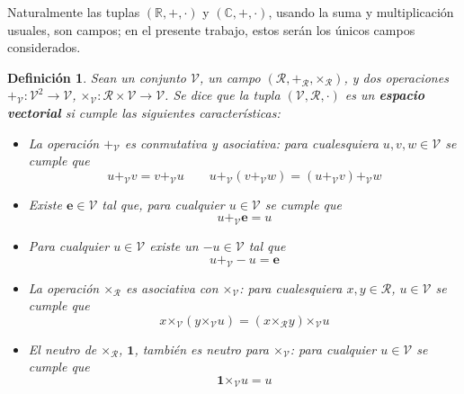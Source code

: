 \documentclass[12pt,letterpaper]{book}
\newtheorem{definicion}{Definición}[chapter]
\newcommand{\R}{\mathbb{R}}
\newcommand{\C}{\mathbb{C}}
\begin{document}
Naturalmente las tuplas $(\R,+,\cdot)$ y $(\C,+,\cdot)$, usando la suma y multiplicación usuales, son campos; en el presente trabajo, estos serán los únicos campos considerados.

\begin{definicion}
Sean un conjunto $\mathcal{V}$, un campo $(\mathcal{R},\boldsymbol{+}_\mathcal{R},\boldsymbol{\times}_\mathcal{R})$, y dos operaciones $\boldsymbol{+}_\mathcal{V} : \mathcal{V}^{2} \rightarrow \mathcal{V}$, $\boldsymbol{\times}_\mathcal{V} : \mathcal{R}\times\mathcal{V} \rightarrow \mathcal{V}$. Se dice que la tupla $(\mathcal{V},\mathcal{R},\mathcal{\cdot})$ es un \textbf{espacio vectorial} si cumple las siguientes características:
\begin{itemize}
\item La operación $\boldsymbol{+}_\mathcal{V}$ es conmutativa y asociativa: para cualesquiera $u, v, w \in \mathcal{V}$ se cumple que
\begin{equation*}
u +_\mathcal{V} v = v +_\mathcal{V} u \qquad u +_\mathcal{V} (v +_\mathcal{V} w) = (u +_\mathcal{V} v) +_\mathcal{V} w
\end{equation*}
\item Existe $\boldsymbol{e} \in \mathcal{V}$ tal que, para cualquier $u \in \mathcal{V}$ se cumple que
\begin{equation*}
 u +_\mathcal{V} \boldsymbol{e} = u
\end{equation*}
\item Para cualquier $u \in \mathcal{V}$ existe un $-u \in \mathcal{V}$ tal que
\begin{equation*}
 u +_\mathcal{V} -u =  \boldsymbol{e}
\end{equation*}
\item La operación $\boldsymbol{\times}_\mathcal{R}$ es asociativa con $\boldsymbol{\times}_\mathcal{V}$: para cualesquiera $x, y \in \mathcal{R}$, $u \in \mathcal{V}$ se cumple que
\begin{equation*}
x \boldsymbol{\times}_\mathcal{V} (y \boldsymbol{\times}_\mathcal{V} u ) = (x \boldsymbol{\times}_\mathcal{R} y) \boldsymbol{\times}_\mathcal{V} u
\end{equation*}
\item El neutro de $\boldsymbol{\times}_\mathcal{R}$, $\boldsymbol{1}$, también es neutro para $\boldsymbol{\times}_\mathcal{V}$: para cualquier $u \in \mathcal{V}$ se cumple que
\begin{equation*}
\boldsymbol{1} \boldsymbol{\times}_\mathcal{V} u = u
\end{equation*}

\end{itemize}
\end{definicion}
\end{document}
